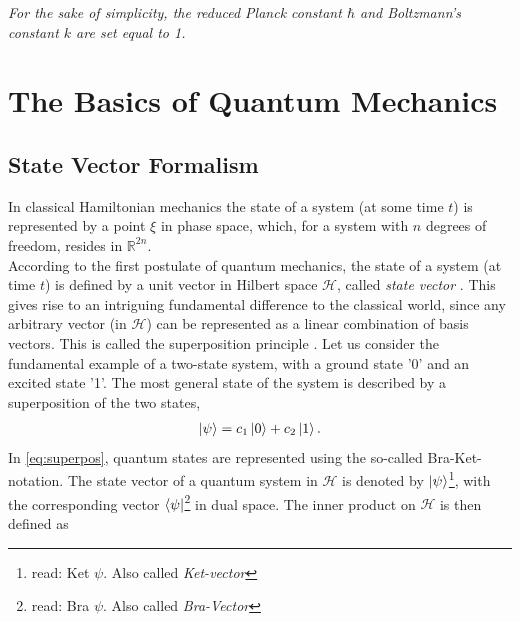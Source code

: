 \documentclass{book}
\numberwithin{equation}{section} %
\begin{document}
\emph{For the sake of simplicity, the reduced Planck constant $\hbar$ and Boltzmann's constant $k$ are set equal to 1.}

\section{The Basics of Quantum Mechanics}

\subsection{State Vector Formalism}\label{sec:statevector}
In classical Hamiltonian mechanics the state of a system (at some time $t$) is represented by a point $\xi$ in phase space,
which, for a system with $n$ degrees of freedom, resides in $\mathbb{R}^{2n}$\cite{BA_Nolting2014}.\\
According to the first postulate of quantum mechanics, the state of a system (at time $t$) is defined by a unit
vector in Hilbert space $\mathcal{H}$, called \emph{state vector} \cite{BA_cohen_tannoudji}.
This gives rise to an intriguing fundamental difference to the classical world,
since any arbitrary vector (in $\mathcal{H}$) can be represented as a linear combination of basis vectors.
This is called the superposition principle \cite{BA_Poschel2015,BA_messiah2014quantum}.
Let us consider the fundamental example of a two-state system, with a ground state '0' and an excited state '1'.
The most general state of the system is described by a superposition of the two states,  
\begin{align}\label{eq:superpos}
    \ket{\psi} = c_1 \ket{0} + c_2 \ket{1}.
\end{align}
In \cref{eq:superpos}, quantum states are represented using the so-called Bra-Ket-notation. 
The state vector of a quantum system in $\mathcal{H}$ is denoted by $\ket{\psi}$\footnote{read: Ket $\psi$. Also called \emph{Ket-vector}},
with the corresponding vector $\bra{\psi}$\footnote{read: Bra $\psi$. Also called \emph{Bra-Vector}} in dual space.
The inner product on $\mathcal{H}$ is then defined as
\end{document}
